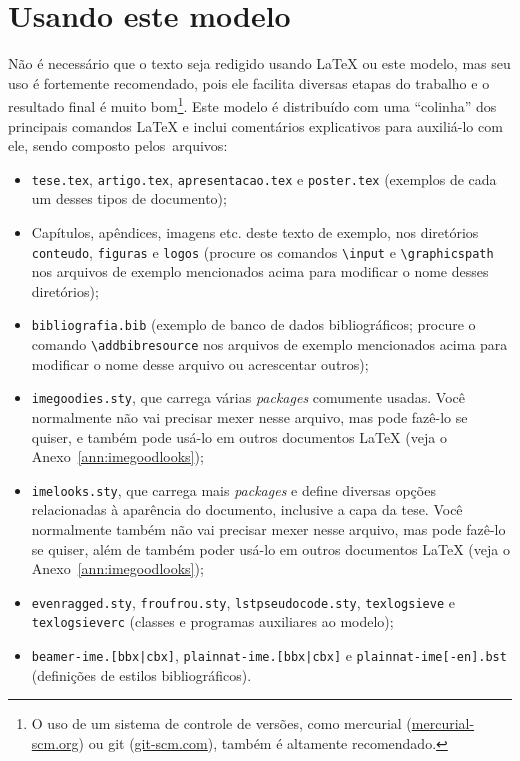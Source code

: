 
\chapter{Usando este modelo}

Não é necessário que o texto seja redigido usando \LaTeX{} ou este modelo,
mas seu uso é fortemente recomendado, pois ele facilita diversas etapas do
trabalho e o resultado final é muito bom\footnote{O uso de um sistema de
controle de versões, como mercurial (\url{mercurial-scm.org}) ou git
(\url{git-scm.com}), também é altamente recomendado.}. Este modelo é
distribuído com uma ``colinha'' dos principais comandos \LaTeX{} e
inclui comentários explicativos para auxiliá-lo com ele, sendo composto
pelos~arquivos:

\enlargethispage{-1\baselineskip}

\begin{itemize}
  \item \texttt{tese.tex}, \texttt{artigo.tex}, \texttt{apresentacao.tex}
        e \texttt{poster.tex} (exemplos de cada um desses tipos de documento);
  \item Capítulos, apêndices, imagens etc. deste texto de exemplo, nos
        diretórios \texttt{conteudo}, \texttt{figuras} e \texttt{logos}
        (procure os comandos \texttt{\textbackslash{}input} e
        \texttt{\textbackslash{}graphicspath} nos arquivos de exemplo
        mencionados acima para modificar o nome desses diretórios);
  \item \texttt{bibliografia.bib} (exemplo de banco de dados bibliográficos;
        procure o comando \texttt{\textbackslash{}addbibresource} nos
        arquivos de exemplo mencionados acima para modificar o nome desse
        arquivo ou acrescentar outros);
  \item \texttt{imegoodies.sty}, que carrega várias \emph{packages} comumente
        usadas. Você normalmente não vai precisar mexer nesse arquivo, mas
        pode fazê-lo se quiser, e também pode usá-lo em outros documentos
        \LaTeX{} (veja o Anexo~\ref{ann:imegoodlooks});
  \item \texttt{imelooks.sty}, que carrega mais \emph{packages} e define
        diversas opções relacionadas à aparência do documento, inclusive
        a capa da tese. Você normalmente também não vai precisar mexer
        nesse arquivo, mas pode fazê-lo se quiser, além de também poder
        usá-lo em outros documentos \LaTeX{} (veja o Anexo~\ref{ann:imegoodlooks});
  \item \texttt{evenragged.sty}, \texttt{froufrou.sty}, \texttt{lstpseudocode.sty},
        \texttt{texlogsieve} e \texttt{texlogsieverc} (classes e programas
        auxiliares ao modelo);
  \item \texttt{beamer-ime.[bbx|cbx]}, \texttt{plainnat-ime.[bbx|cbx]} e
        \texttt{plainnat-ime[-en].bst} (definições de estilos bibliográficos).
\end{itemize}

